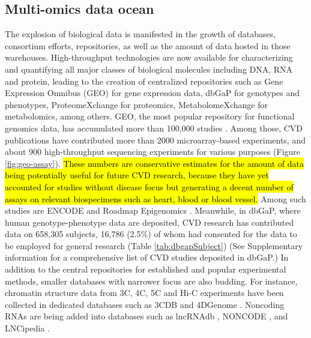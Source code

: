 \documentclass[letter]{bioinfo}
\begin{document}
	\subsection*{Multi-omics data ocean}
    The explosion of biological data is manifested in the growth of databases, consortium efforts, repositories, as well as the amount of data hosted in those warehouses. High-throughput technologies are now available for characterizing and quantifying all major classes of biological molecules including DNA, RNA and protein, leading to the creation of centralized repositories such as Gene Expression Omnibus (GEO) \citep{Barrett:2013:NCBI} for gene expression data, dbGaP \citep{Tryka:2014:dbGaP} for genotypes and phenotypes, ProteomeXchange \citep{Vizcaino:2014:ProteomeXchange,Deutsch:2017:ProteomeXchange} for proteomics, MetabolomeXchange for metabolomics, among others.  GEO, the most popular repository for functional genomics data, has accumulated more than 100,000 studies \citep{Zhu:2008:GEOmetadb}. Among those, CVD publications have contributed more than 2000 microarray-based experiments, and about 900 high-throughput sequencing experiments for various purposes (Figure \ref{fig:geo-assay}). \hl{These numbers are conservative estimates for the amount of data being potentially useful for future CVD research, because they have yet accounted for studies without disease focus but generating a decent number of assays on relevant biospecimens such as heart, blood or blood vessel.} Among such studies are ENCODE \citep{ENCODE:2012:integrated} and Roadmap Epigenomics \citep{Roadmap:2015:Integrative}.
	Meanwhile, in dbGaP, where human genotype-phenotype data are deposited, CVD research has contributed data on 658,305 subjects, 16,786 (2.5\%) of whom had consented for the data to be employed for general research (Table \ref{tab:dbgapSubject}) (See Supplementary information for a comprehensive list of CVD studies deposited in dbGaP.)
	In addition to the central repositories for established and popular experimental methods, smaller databases with narrower focus are also budding. For instance, chromatin structure data from 3C, 4C, 5C and Hi-C experiments have been collected in dedicated databases such as 3CDB \citep{Yun:2016:3CDB} and 4DGenome \citep{Teng:2015:4DGenome}. Noncoding RNAs are being added into databases such as lncRNAdb \citep{Quek:2015:lncRNAdb}, NONCODE \citep{Fang:2018:NONCODEV5}, and LNCipedia \citep{Volders:2018:LNCipedia}.
	
\end{document}
